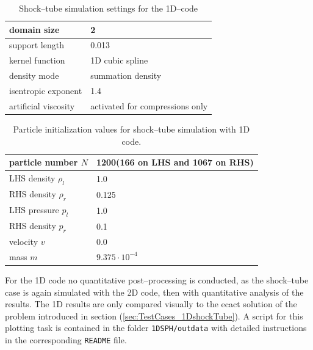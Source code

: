 \documentclass[11pt,a4paper,twoside]{report}
\begin{document}
\begin{table}[h] %
\label{tab:SimuSettings_1DCode_Shock}
\centering

\begin{tabular}[c]{|l|p{5cm}|} %
\hline
\hline
domain size &  2\\
\hline
support length &0.013 \\
\hline
kernel function & 1D cubic spline \\
\hline
density mode & summation density \\
\hline
isentropic exponent & 1.4\\
\hline
artificial viscosity& activated for compressions only\\ 
\hline
\hline
\end{tabular}
\caption[]{Shock--tube simulation settings for the 1D--code}

\end{table}


\begin{table}[h] %
\label{tab:InitPartValues_1DCode_Shock}
\centering

\begin{tabular}[c]{|l|p{5cm}|} %
\hline
\hline
particle number $N$ &  1200\newline (166 on LHS and 1067 on RHS)\\
\hline
LHS density $\rho_l$ &  1.0\\
\hline
RHS density $\rho_r$ &  0.125\\
\hline
LHS pressure $p_l$ &  1.0\\
\hline
RHS density $p_r$ &  0.1\\
\hline
velocity $v$ & 0.0\\
\hline
mass $m$ & $9.375\cdot10^{-4}$\\
\hline
\hline
\end{tabular}
\caption[]{Particle initialization values for shock--tube simulation with 1D code.}

\end{table}



For the 1D code no quantitative post--processing is conducted, as the shock--tube case is again simulated with the 2D code, then with quantitative analysis of the results. 
The 1D results are only compared visually to the ecact solution of the problem introduced in section (\ref{sec:TestCases_1DshockTube}). A script for this plotting task is contained in the folder {\tt 1DSPH/outdata} with detailed instructions in the corresponding {\tt README} file.
\end{document}
